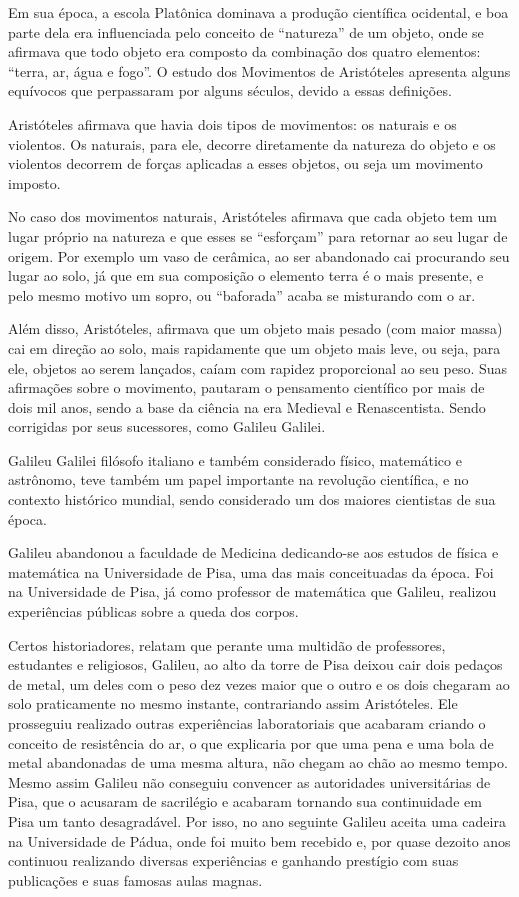 Em sua época, a escola Platônica dominava a produção científica ocidental, e boa parte dela era influenciada pelo conceito de “natureza” de um objeto, onde se afirmava que todo objeto era composto da combinação dos quatro elementos: “terra, ar, água e fogo”. O estudo dos Movimentos de Aristóteles apresenta alguns equívocos que perpassaram por alguns séculos, devido a essas definições.

Aristóteles afirmava que havia dois tipos de movimentos: os naturais e os violentos. Os naturais, para ele, decorre diretamente da natureza do objeto e os violentos decorrem de  forças aplicadas a esses objetos, ou seja um movimento imposto.

No caso dos movimentos naturais, Aristóteles afirmava que cada objeto tem um lugar próprio na natureza e que esses se “esforçam” para retornar ao seu lugar de origem. Por exemplo um vaso de cerâmica, ao ser abandonado cai procurando seu lugar ao solo, já que em sua composição o elemento terra é o mais presente, e pelo mesmo motivo um sopro, ou “baforada” acaba se misturando com o ar.

Além disso, Aristóteles, afirmava que um objeto mais pesado (com maior massa) cai em direção ao solo, mais rapidamente que um objeto mais leve, ou seja, para ele, objetos ao serem lançados, caíam com rapidez proporcional ao seu peso. Suas afirmações sobre o movimento, pautaram o pensamento científico por mais de dois mil anos, sendo a base da ciência na era Medieval e Renascentista. Sendo corrigidas por seus sucessores, como Galileu Galilei.

Galileu Galilei filósofo italiano e também considerado físico, matemático e astrônomo, teve também um papel importante na revolução científica, e no contexto histórico mundial, sendo considerado um dos maiores cientistas de sua época.

Galileu abandonou a faculdade de Medicina dedicando-se aos estudos de física e matemática na Universidade de Pisa, uma das mais conceituadas da época. Foi na Universidade de Pisa, já como professor de matemática que Galileu, realizou experiências públicas sobre a queda dos corpos.

Certos historiadores, relatam que perante uma multidão de professores, estudantes e religiosos, Galileu, ao alto da torre de Pisa deixou cair dois pedaços de metal, um deles com o peso dez vezes maior que o outro e os dois chegaram ao solo praticamente no mesmo instante, contrariando assim Aristóteles. Ele prosseguiu realizado outras experiências laboratoriais que acabaram criando o conceito de resistência do ar, o que explicaria por que uma pena e uma bola de metal abandonadas de uma mesma altura, não chegam ao chão ao mesmo tempo. Mesmo assim Galileu não conseguiu convencer as autoridades universitárias de Pisa, que o acusaram de sacrilégio e acabaram tornando sua continuidade em Pisa um tanto desagradável. Por isso, no ano seguinte Galileu aceita uma cadeira na Universidade de Pádua, onde foi muito bem recebido e, por quase dezoito anos continuou realizando diversas experiências e ganhando prestígio com suas publicações e suas famosas aulas magnas.

